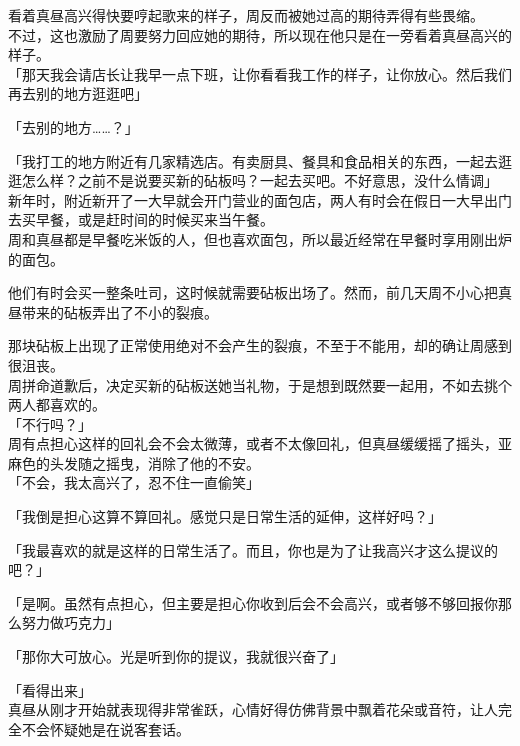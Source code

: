 看着真昼高兴得快要哼起歌来的样子，周反而被她过高的期待弄得有些畏缩。\\

不过，这也激励了周要努力回应她的期待，所以现在他只是在一旁看着真昼高兴的样子。\\

「那天我会请店长让我早一点下班，让你看看我工作的样子，让你放心。然后我们再去别的地方逛逛吧」

「去别的地方……？」

「我打工的地方附近有几家精选店。有卖厨具、餐具和食品相关的东西，一起去逛逛怎么样？之前不是说要买新的砧板吗？一起去买吧。不好意思，没什么情调」\\

新年时，附近新开了一大早就会开门营业的面包店，两人有时会在假日一大早出门去买早餐，或是赶时间的时候买来当午餐。\\

周和真昼都是早餐吃米饭的人，但也喜欢面包，所以最近经常在早餐时享用刚出炉的面包。

他们有时会买一整条吐司，这时候就需要砧板出场了。然而，前几天周不小心把真昼带来的砧板弄出了不小的裂痕。

那块砧板上出现了正常使用绝对不会产生的裂痕，不至于不能用，却的确让周感到很沮丧。\\

周拼命道歉后，决定买新的砧板送她当礼物，于是想到既然要一起用，不如去挑个两人都喜欢的。\\

「不行吗？」\\

周有点担心这样的回礼会不会太微薄，或者不太像回礼，但真昼缓缓摇了摇头，亚麻色的头发随之摇曳，消除了他的不安。\\

「不会，我太高兴了，忍不住一直偷笑」

「我倒是担心这算不算回礼。感觉只是日常生活的延伸，这样好吗？」

「我最喜欢的就是这样的日常生活了。而且，你也是为了让我高兴才这么提议的吧？」

「是啊。虽然有点担心，但主要是担心你收到后会不会高兴，或者够不够回报你那么努力做巧克力」

「那你大可放心。光是听到你的提议，我就很兴奋了」

「看得出来」\\

真昼从刚才开始就表现得非常雀跃，心情好得仿佛背景中飘着花朵或音符，让人完全不会怀疑她是在说客套话。\\

